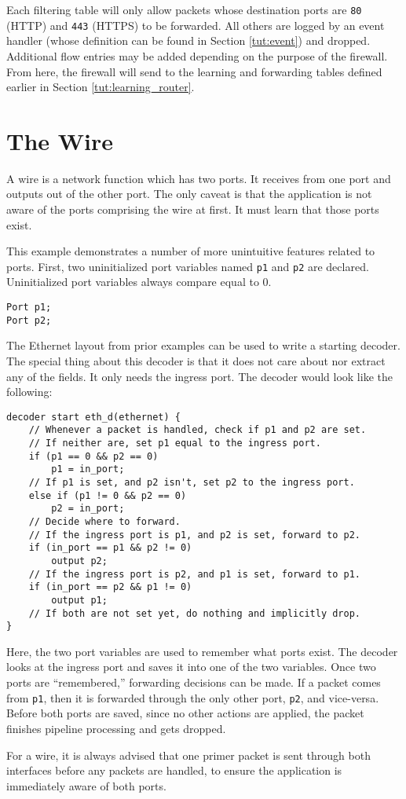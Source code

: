 Each filtering table will only allow packets whose destination ports are \texttt{80} (HTTP) and \texttt{443} (HTTPS) to be forwarded. All others are logged by an event handler (whose definition can be found in Section \ref{tut:event}) and dropped. Additional flow entries may be added depending on the purpose of the firewall.  From here, the firewall will send to the learning and forwarding tables defined earlier in Section \ref{tut:learning_router}.

\section{The Wire} \label{tut:wire}

A wire is a network function which has two ports. 
It receives from one port
and outputs out of the other port. The only caveat is that the application is
not aware of the ports comprising the wire at first. It must learn that those
ports exist.

This example demonstrates a number of more unintuitive features related to
ports. First, two uninitialized port variables named \texttt{p1} and
\texttt{p2} are declared. Uninitialized port variables always compare equal to 0.

\begin{lstlisting}
Port p1;
Port p2;
\end{lstlisting}

The Ethernet layout from prior examples can be used to write a starting decoder. The
special thing about this decoder is that it does not care about nor extract any of the fields.
It only needs the ingress port. The decoder would look like the following:

\begin{lstlisting}
decoder start eth_d(ethernet) {
	// Whenever a packet is handled, check if p1 and p2 are set.
	// If neither are, set p1 equal to the ingress port.
	if (p1 == 0 && p2 == 0)
		p1 = in_port;
	// If p1 is set, and p2 isn't, set p2 to the ingress port.
	else if (p1 != 0 && p2 == 0)
		p2 = in_port;
	// Decide where to forward.
	// If the ingress port is p1, and p2 is set, forward to p2.
	if (in_port == p1 && p2 != 0)
		output p2;
	// If the ingress port is p2, and p1 is set, forward to p1.
	if (in_port == p2 && p1 != 0)
		output p1;
	// If both are not set yet, do nothing and implicitly drop.
}
\end{lstlisting}

Here, the two port variables are used to remember what ports exist. The decoder
looks at the ingress port and saves it into one of the two variables. Once two
ports are ``remembered,'' forwarding decisions can be made. If a packet comes from
\texttt{p1}, then it is forwarded through the only other port, \texttt{p2}, and
vice-versa. Before both ports are saved, since no other actions are applied, the
packet finishes pipeline processing and gets dropped.

For a wire, it is always advised that one primer packet is sent 
through both interfaces before any packets are handled, to ensure the application 
is immediately aware of both ports.